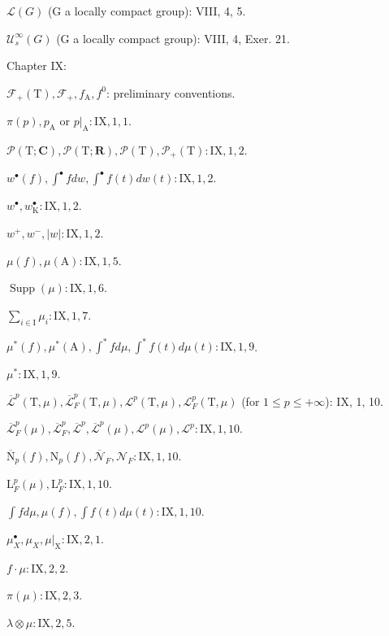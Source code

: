 \(\mathcal{L}(G)\) (G a locally compact group): VIII, 4, 5.

\(\mathcal{U}_{s}^{\infty}(G)\) (G a locally compact group): VIII, 4, Exer. 21.

Chapter IX:

\(\mathcal{F}_{+}(\mathrm{T}), \mathcal{F}_{+}, f_{\mathrm{A}}, f^{0}\): preliminary conventions.

\(\pi(p), p_{\mathrm{A}}\) or \(p|_{\mathrm{A}}: \mathrm{IX}, 1, 1\).

\(\mathcal{P}(\mathrm{T}; \mathbf{C}), \mathcal{P}(\mathrm{T}; \mathbf{R}), \mathcal{P}(\mathrm{T}), \mathcal{P}_{+}(\mathrm{T}): \mathrm{IX}, 1, 2\).

\(w^{\bullet}(f), \int^{\bullet} f dw, \int^{\bullet} f(t) dw(t): \mathrm{IX}, 1, 2\).

\(w^{\bullet}, w_{\mathrm{K}}^{\bullet}: \mathrm{IX}, 1, 2\).

\(w^{+}, w^{-}, |w|: \mathrm{IX}, 1, 2\).

\(\mu(f), \mu(\mathrm{A}): \mathrm{IX}, 1, 5\).

\(\operatorname{Supp}(\mu): \mathrm{IX}, 1, 6\).

\(\sum_{i \in \mathrm{I}} \mu_i: \mathrm{IX}, 1, 7\).

\(\mu^*(f), \mu^*(\mathrm{A}), \int^* f d\mu, \int^* f(t) d\mu(t): \mathrm{IX}, 1, 9\).

\(\mu^*: \mathrm{IX}, 1, 9\).

\(\overline{\mathcal{L}}^p(\mathrm{T}, \mu), \overline{\mathcal{L}}_F^p(\mathrm{T}, \mu), \mathcal{L}^p(\mathrm{T}, \mu), \mathcal{L}_F^p(\mathrm{T}, \mu)\) (for \(1 \leqslant p \leqslant +\infty\)): IX, 1, 10.

\(\overline{\mathcal{L}}_F^p(\mu), \overline{\mathcal{L}}_F^p, \overline{\mathcal{L}}^p, \overline{\mathcal{L}}^p(\mu), \mathcal{L}^p(\mu), \mathcal{L}^p: \mathrm{IX}, 1, 10\).

\(\overline{\mathrm{N}}_p(f), \mathrm{N}_p(f), \overline{\mathcal{N}}_F, \mathcal{N}_F: \mathrm{IX}, 1, 10\).

\(\mathrm{L}_F^p(\mu), \mathrm{L}_F^p: \mathrm{IX}, 1, 10\).

\(\int f d\mu, \mu(f), \int f(t) d\mu(t): \mathrm{IX}, 1, 10\).

\(\mu_X^\bullet, \mu_X, \mu|_{\mathrm{X}}: \mathrm{IX}, 2, 1\).

\(f \cdot \mu: \mathrm{IX}, 2, 2\).

\(\pi(\mu): \mathrm{IX}, 2, 3\).

\(\lambda \otimes \mu: \mathrm{IX}, 2, 5\).

